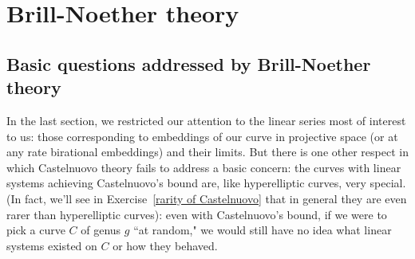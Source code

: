 %
%
% 
%
%
%
%

\section{Brill-Noether theory}

\subsection{Basic questions addressed by Brill-Noether theory}

In the last section, we restricted our attention to the linear series most of interest to us: those corresponding to embeddings of our curve in projective space (or at any rate birational embeddings) and their limits. But there is one other respect in which Castelnuovo theory fails to address a basic concern: the curves with linear systems achieving Castelnuovo's bound are, like hyperelliptic curves, very special. (In fact, we'll see in Exercise~\ref{rarity of Castelnuovo} that in general they are even rarer than hyperelliptic curves): even with Castelnuovo's bound, if we were to pick a curve $C$ of genus $g$ ``at random," we would still have no idea what linear systems existed on $C$ or how they behaved.

